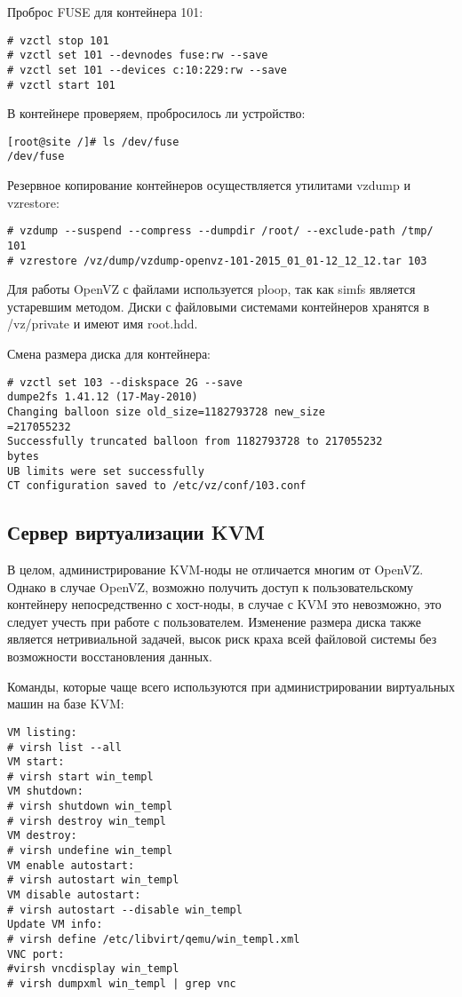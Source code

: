 Проброс FUSE для контейнера 101:
\begin{lstlisting}
# vzctl stop 101
# vzctl set 101 --devnodes fuse:rw --save
# vzctl set 101 --devices c:10:229:rw --save
# vzctl start 101
\end{lstlisting}

В контейнере проверяем, пробросилось ли устройство:
\begin{lstlisting}
[root@site /]# ls /dev/fuse
/dev/fuse
\end{lstlisting}

Резервное копирование контейнеров осуществляется утилитами vzdump и vzrestore:
\begin{lstlisting}
# vzdump --suspend --compress --dumpdir /root/ --exclude-path /tmp/ 101
# vzrestore /vz/dump/vzdump-openvz-101-2015_01_01-12_12_12.tar 103
\end{lstlisting}

Для работы OpenVZ с файлами используется ploop, так как simfs является устаревшим методом.
Диски с файловыми системами контейнеров хранятся в /vz/private и имеют имя root.hdd.

Смена размера диска для контейнера:
\begin{lstlisting}
# vzctl set 103 --diskspace 2G --save
dumpe2fs 1.41.12 (17-May-2010)
Changing balloon size old_size=1182793728 new_size
=217055232
Successfully truncated balloon from 1182793728 to 217055232
bytes
UB limits were set successfully
CT configuration saved to /etc/vz/conf/103.conf
\end{lstlisting}

\subsection{Сервер виртуализации KVM}

В целом, администрирование KVM-ноды не отличается многим от OpenVZ.
Однако в случае OpenVZ, возможно получить доступ к пользовательскому контейнеру непосредственно с хост-ноды, в случае с KVM это невозможно, это следует учесть при работе с пользователем.
Изменение размера диска также является нетривиальной задачей, высок риск краха всей файловой системы без возможности восстановления данных.

Команды, которые чаще всего используются при администрировании виртуальных машин на базе KVM:
\begin{lstlisting}
VM listing:
# virsh list --all
VM start:
# virsh start win_templ
VM shutdown:
# virsh shutdown win_templ
# virsh destroy win_templ
VM destroy:
# virsh undefine win_templ
VM enable autostart:
# virsh autostart win_templ
VM disable autostart:
# virsh autostart --disable win_templ
Update VM info:
# virsh define /etc/libvirt/qemu/win_templ.xml
VNC port:
#virsh vncdisplay win_templ
# virsh dumpxml win_templ | grep vnc
\end{lstlisting}

